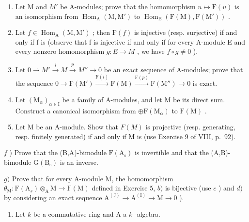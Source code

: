 \begin{enumerate}
\def\labelenumi{\alph{enumi})}
\item
  Let M and \(M'\) be A-modules; prove that the homomorphism \(u \mapsto \mathrm{F}(u)\) is an isomorphism from \(\operatorname{Hom}_{\mathrm{A}}(\mathrm{M}, \mathrm{M}')\) to \(\operatorname{Hom}_{\mathrm{B}}(\mathrm{F}(\mathrm{M}), \mathrm{F}(\mathrm{M}'))\) .
\item
  Let \(f \in \operatorname{Hom}_{\mathrm{A}}(\mathrm{M}, \mathrm{M}')\) ; then \(\mathrm{F}(f)\) is injective (resp. surjective) if and only if f is (observe that f is injective if and only if for every A-module E and every nonzero homomorphism \(g : E \to M\) , we have \(f \circ g \neq 0\) ).
\item
  Let \(0 \to M' \xrightarrow{i} M \xrightarrow{p} M'' \to 0\) be an exact sequence of A-modules; prove that the sequence \(0 \to \mathrm{F}(\mathrm{M}') \xrightarrow{\mathrm{F}(i)} \mathrm{F}(\mathrm{M}) \xrightarrow{\mathrm{F}(p)} \mathrm{F}(\mathrm{M}'') \to 0\) is exact.
\item
  Let \((\mathrm{M}_{\alpha})_{\alpha\in\mathrm{I}}\) be a family of A-modules, and let M be its direct sum. Construct a canonical isomorphism from \(\oplus\mathrm{F}(\mathrm{M}_{\alpha})\) to \(\mathrm{F}(\mathrm{M})\) .
\item
  Let M be an A-module. Show that \(F(M)\) is projective (resp. generating, resp. finitely generated) if and only if M is (use Exercise 9 of VIII, p.~92).
\end{enumerate}

\(f\) ) Prove that the (B,A)-bimodule \(\mathrm{F(A_s)}\) is invertible and that the (A,B)-bimodule \(\mathrm{G(B_s)}\) is an inverse.

\(g)\) Prove that for every A-module M, the homomorphism \(\theta_{\mathrm{M}}: \mathrm{F}(\mathrm{A}_s) \otimes_{\mathrm{A}} \mathrm{M} \to \mathrm{F}(\mathrm{M})\) defined in Exercise 5, \(b)\) is bijective (use \(c\) ) and \(d)\) by considering an exact sequence \(\mathrm{A}^{(\mathrm{J})} \to \mathrm{A}^{(\mathrm{I})} \to \mathrm{M} \to 0\) ).

\begin{enumerate}
\def\labelenumi{\arabic{enumi})}
\setcounter{enumi}{7}
\tightlist
\item
  Let \(k\) be a commutative ring and A a \(k\) -algebra.
\end{enumerate}

